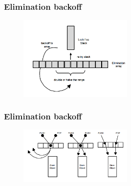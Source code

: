 \documentclass[aspectratio=169, pdf, 8pt, unicode]{beamer}
\begin{document}
\begin{frame}[fragile]
\frametitle{Elimination backoff}
\begin{figure}[H]
\includegraphics[width=0.5\textwidth]{fig/elimination_backoff_1.png}
\end{figure}
\end{frame}

\begin{frame}[fragile]
\frametitle{Elimination backoff}
\begin{figure}[H]
\includegraphics[width=0.5\textwidth]{fig/elimination_backoff_2.png}
\end{figure}
\end{frame}
\end{document}

